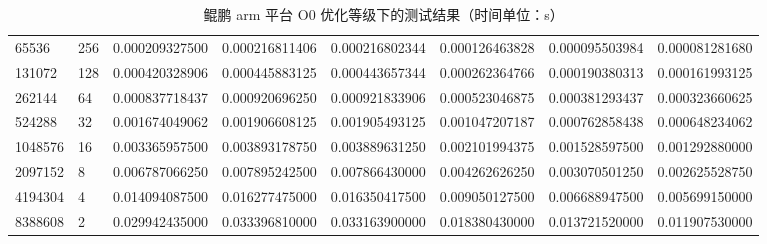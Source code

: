 \documentclass[a4paper]{article}
\begin{document}
\begin{table}[]
{\begin{tabular}{llllllll}
      65536   & 256     & 0.000209327500 & 0.000216811406  & 0.000216802344 & 0.000126463828 & 0.000095503984 & 0.000081281680 \\
      131072  & 128     & 0.000420328906 & 0.000445883125  & 0.000443657344 & 0.000262364766 & 0.000190380313 & 0.000161993125 \\
      262144  & 64      & 0.000837718437 & 0.000920696250  & 0.000921833906 & 0.000523046875 & 0.000381293437 & 0.000323660625 \\
      524288  & 32      & 0.001674049062 & 0.001906608125  & 0.001905493125 & 0.001047207187 & 0.000762858438 & 0.000648234062 \\
      1048576 & 16      & 0.003365957500 & 0.003893178750  & 0.003889631250 & 0.002101994375 & 0.001528597500 & 0.001292880000 \\
      2097152 & 8       & 0.006787066250 & 0.007895242500  & 0.007866430000 & 0.004262626250 & 0.003070501250 & 0.002625528750 \\
      4194304 & 4       & 0.014094087500 & 0.016277475000  & 0.016350417500 & 0.009050127500 & 0.006688947500 & 0.005699150000 \\
      8388608 & 2       & 0.029942435000 & 0.033396810000  & 0.033163900000 & 0.018380430000 & 0.013721520000 & 0.011907530000
    \end{tabular}%
  }
  \caption{鲲鹏 arm 平台 O0 优化等级下的测试结果（时间单位：s）}
  \label{tab:arm-O0-test}
\end{table}
\end{document}
